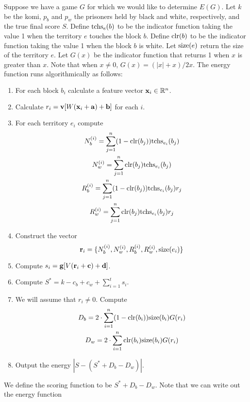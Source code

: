 \documentclass[11pt,letterpaper]{article}
\begin{document}
Suppose we have a game $G$ for which we would like to determine $E(G)$. Let $k$ be the komi, $p_b$ and $p_w$
the prisoners held by black and white, respectively, and the true final score $S$. Define $\mbox{tchs}_{ e }{\left( b \right)}$ to be the
indicator function taking the value 1 when the territory $e$ touches the block $b$. Define $\mbox{clr}{\left( b \right)}$ to be the
indicator function taking the value 1 when the block $b$ is white. Let $\mbox{size}{\left( e \right)}$ return the size of the territory $e$.
Let $G(x)$ be the indicator function that returns 1 when $x$ is greater than $x$. Note that when $x \neq 0$, 
$G(x) = (|x| + x) / 2x$. The energy function runs algorithmically as follows:
\begin{enumerate}
  \item For each block $b_i$ calculate a feature vector $\mathbf{ x }_i \in \mathbb{ R }^n$.
  \item Calculate $r_i = \mathbf{ v }[W(\mathbf{ x }_i + \mathbf{ a }) + \mathbf{ b }]$ for each $i$.
  \item For each territory $e_i$ compute
    \begin{gather*}
      N_b^{ (i) } = \sum_{ j = 1 }^n (1 - \mbox{clr}{\left( b_j \right)}) \mbox{tchs}_{ e_i }{\left( b_j \right)}\\
      N_w^{ (i) } = \sum_{ j = 1 }^n \mbox{clr}{\left( b_j \right)} \mbox{tchs}_{ e_i }{\left( b_j \right)}\\
      R_b^{ (i) } = \sum_{ j = 1 }^n (1 - \mbox{clr}{\left( b_j \right)}) \mbox{tchs}_{ e_i }{\left( b_j \right)} r_j\\
      R_w^{ (i) } = \sum_{ j = 1 }^n \mbox{clr}{\left( b_j \right)} \mbox{tchs}_{ e_i }{\left( b_j \right)} r_j
    \end{gather*}
  \item Construct the vector
    $$\mathbf{ r }_i = \{ N_b^{ (i) }, N_w^{ (i) }, R_b^{ (i) }, R_w^{ (i) }, \mbox{size}{\left( e_i \right)} \}$$
  \item Compute $s_i = \mathbf{ g }[V(\mathbf{ r }_i + \mathbf{ c }) + \mathbf{ d }]$.
  \item Compute $S^* = k - c_b + c_w + \sum_{ i = 1 }^t s_i$.
  \item We will assume that $r_i \neq 0$. Compute
    \begin{gather*}
      D_b = 2 \cdot \sum_{ i = 1 }^n (1 - \mbox{clr}{\left( b_i \right)}) \mbox{size}{\left( b_i \right)} G(r_i)\\
      D_w = 2 \cdot \sum_{ i = 1 }^n \mbox{clr}{\left( b_i \right)} \mbox{size}{\left( b_i \right)} G(r_i)
    \end{gather*}
  \item Output the energy $|S - (S^* + D_b - D_w)|$.
\end{enumerate}
We define the scoring function to be $S^* + D_b - D_w$. Note that we can write out the energy function
\end{document}
